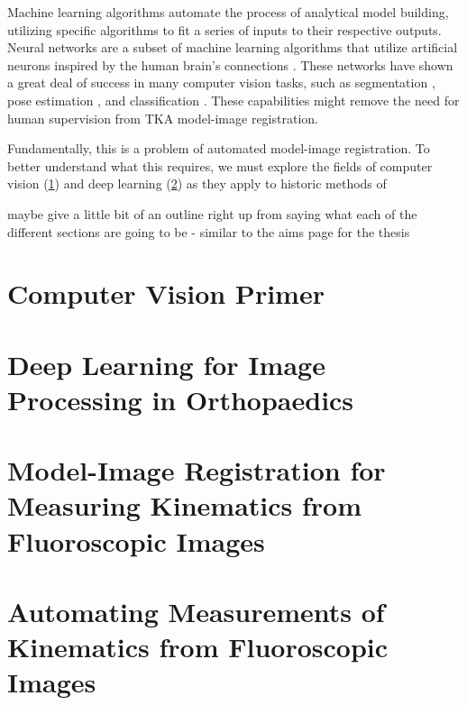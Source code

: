 Machine learning algorithms automate the process of analytical model building, utilizing specific algorithms to fit a series of inputs to their respective outputs. Neural networks are a subset of machine learning algorithms that utilize artificial neurons inspired by the human brain's connections \cite{marrEarlyProcessingVisual1976}. These networks have shown a great deal of success in many computer vision tasks, such as segmentation \cite{chanHistoSegNetSemanticSegmentation2019,wangDeepHighResolutionRepresentation2020,ronnebergerUNetConvolutionalNetworks2015}, pose estimation \cite{wuDeepGraphPose2020,kendallGeometricLossFunctions2017}, and classification \cite{krizhevskyImageNetClassificationDeep2017,qiPointNetDeepHierarchical2017,qiPointNetDeepLearning2017}. These capabilities might remove the need for human supervision from TKA model-image registration.

Fundamentally, this is a problem of automated model-image registration. To better understand what this requires, we must explore the fields of computer vision (\cref{sec:cv-primer}) and deep learning (\cref{sec:deep-learning}) as they apply to historic methods of 

{
\Huge{maybe give a little bit of an outline right up from saying what each of the different sections are going to be - similar to the aims page for the thesis}
}
\section{Computer Vision Primer}
\label{sec:cv-primer}


\section{Deep Learning for Image Processing in Orthopaedics}
\label{sec:deep-learning}


\section{Model-Image Registration for Measuring Kinematics from Fluoroscopic Images}
\label{sec:model-image-registration}


\section{Automating Measurements of Kinematics from Fluoroscopic Images}
\label{sec:autonomous-kinematics}

